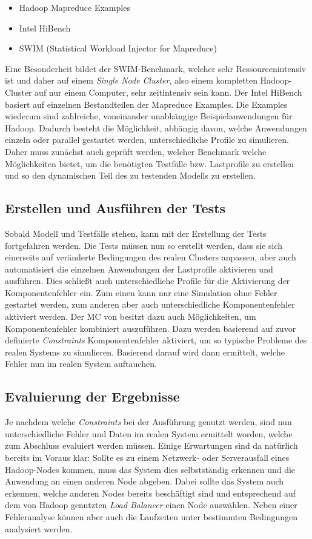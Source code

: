\begin{itemize}[noitemsep]
	\item Hadoop Mapreduce Examples
	\item Intel HiBench
	\item SWIM (Statistical Workload Injector for Mapreduce)
\end{itemize}

Eine Besonderheit bildet der SWIM-Benchmark, welcher sehr Ressourcenintensiv ist und daher auf einem \emph{Single Node Cluster}, also einem kompletten Hadoop-Cluster auf nur einem Computer, sehr zeitintensiv sein kann. Der Intel HiBench basiert auf einzelnen Bestandteilen der Mapreduce Examples. Die Examples wiederum sind zahlreiche, voneinander unabhängige Beispielanwendungen für Hadoop. Dadurch besteht die Möglichkeit, abhängig davon, welche Anwendungen einzeln oder parallel gestartet werden,  unterschiedliche Profile zu simulieren. Daher muss zunächst auch geprüft werden, welcher Benchmark welche Möglichkeiten bietet, um die benötigten Testfälle bzw. Lastprofile zu erstellen und so den dynamischen Teil des zu testenden Modells zu erstellen.

\subsection{Erstellen und Ausführen der Tests}\label{sec:testausführung}

Sobald Modell und Testfälle stehen, kann mit der Erstellung der Tests fortgefahren werden. Die Tests müssen nun so erstellt werden, dass sie sich einerseits auf veränderte Bedingungen des realen Clusters anpassen, aber auch automatisiert die einzelnen Anwendungen der Lastprofile aktivieren und ausführen. Dies schließt auch unterschiedliche Profile für die Aktivierung der Komponentenfehler ein. Zum einen kann nur eine Simulation ohne Fehler gestartet werden, zum anderen aber auch unterschiedliche Komponentenfehler aktiviert werden. Der MC von \sS besitzt dazu auch Möglichkeiten, um Komponentenfehler kombiniert auszuführen. Dazu werden basierend auf zuvor definierte \emph{Constraints} Komponentenfehler aktiviert, um so typische Probleme des realen Systems zu simulieren. Basierend darauf wird dann ermittelt, welche Fehler nun im realen System auftauchen.

\subsection{Evaluierung der Ergebnisse}\label{sec:evaluierung}

Je nachdem welche \emph{Constraints} bei der Ausführung genutzt werden, sind nun unterschiedliche Fehler und Daten im realen System ermittelt worden, welche zum Abschluss evaluiert werden müssen. Einige Erwartungen sind da natürlich bereits im Voraus klar: Sollte es zu einem Netzwerk- oder Serverausfall eines Hadoop-Nodes kommen, muss das System dies selbstständig erkennen und die Anwendung an einen anderen Node abgeben. Dabei sollte das System auch erkennen, welche anderen Nodes bereits beschäftigt sind und entsprechend auf dem von Hadoop genutzten \emph{Load Balancer} einen Node auswählen. Neben einer Fehleranalyse können aber auch die Laufzeiten unter bestimmten Bedingungen analysiert werden.
